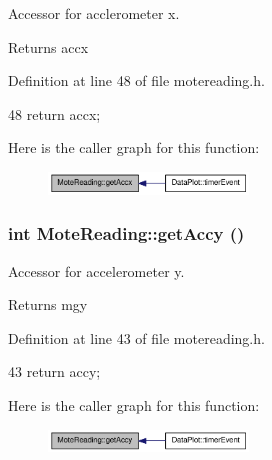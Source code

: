 Accessor for acclerometer x. 

\begin{DoxyReturn}{Returns}
accx 
\end{DoxyReturn}


Definition at line 48 of file motereading.h.




\begin{DoxyCode}
48 { return accx; }
\end{DoxyCode}




Here is the caller graph for this function:\nopagebreak
\begin{figure}[H]
\begin{center}
\leavevmode
\includegraphics[width=151pt]{classMoteReading_ad79a65f84dfaacc9b5c179fb66a5545f_icgraph}
\end{center}
\end{figure}


\hypertarget{classMoteReading_af918c7ca6c9fea98a3d608b61dbaffae}{
\subsubsection[{getAccy}]{\setlength{\rightskip}{0pt plus 5cm}int MoteReading::getAccy ()}}
\label{classMoteReading_af918c7ca6c9fea98a3d608b61dbaffae}


Accessor for accelerometer y. 

\begin{DoxyReturn}{Returns}
mgy 
\end{DoxyReturn}


Definition at line 43 of file motereading.h.




\begin{DoxyCode}
43 { return accy; }
\end{DoxyCode}




Here is the caller graph for this function:\nopagebreak
\begin{figure}[H]
\begin{center}
\leavevmode
\includegraphics[width=151pt]{classMoteReading_af918c7ca6c9fea98a3d608b61dbaffae_icgraph}
\end{center}
\end{figure}


